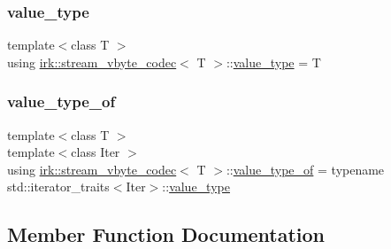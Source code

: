 \subsubsection{\texorpdfstring{value\+\_\+type}{value\_type}}
{\footnotesize\ttfamily template$<$class T $>$ \\
using \mbox{\hyperlink{structirk_1_1stream__vbyte__codec}{irk\+::stream\+\_\+vbyte\+\_\+codec}}$<$ T $>$\+::\mbox{\hyperlink{structirk_1_1stream__vbyte__codec_a770dc53873c94b550afb65a87b33fb67}{value\+\_\+type}} =  T}

\mbox{\label{structirk_1_1stream__vbyte__codec_a795a3b9b804c21011d5021417712b8c7}} 
\subsubsection{\texorpdfstring{value\+\_\+type\+\_\+of}{value\_type\_of}}
{\footnotesize\ttfamily template$<$class T $>$ \\
template$<$class Iter $>$ \\
using \mbox{\hyperlink{structirk_1_1stream__vbyte__codec}{irk\+::stream\+\_\+vbyte\+\_\+codec}}$<$ T $>$\+::\mbox{\hyperlink{structirk_1_1stream__vbyte__codec_a795a3b9b804c21011d5021417712b8c7}{value\+\_\+type\+\_\+of}} =  typename std\+::iterator\+\_\+traits$<$Iter$>$\+::\mbox{\hyperlink{structirk_1_1stream__vbyte__codec_a770dc53873c94b550afb65a87b33fb67}{value\+\_\+type}}}



\subsection{Member Function Documentation}
\mbox{\label{structirk_1_1stream__vbyte__codec_a22e3adfa45fcb5f19a70720cc73c771f}} 
